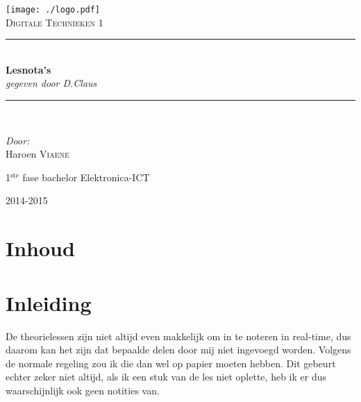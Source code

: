 \documentclass[11pt, a4paper]{article}
\newcommand{\HRule}{\rule{\linewidth}{0.5mm}}
\begin{document}
\begin{titlepage}
\begin{center}
\texttt{[image: ./logo.pdf]}~\\[1cm]


\textsc{\Large Digitale Technieken 1}\\[0.5cm]

\HRule \\[0.4cm]
{ \LARGE \bfseries Lesnota's}\\[0.4cm]
{\large \textit{gegeven door D.Claus}}\\[0.2cm]

\HRule \\[1.5cm]

\begin{minipage}{0.4\textwidth}
\begin{flushleft} \large
\emph{Door: }\\
Haroen \textsc{Viaene}\\

\end{flushleft}
\end{minipage}
\begin{minipage}{0.4\textwidth}
\begin{flushright} \large
\large{1$^{\text{ste}}$ fase bachelor Elektronica-ICT}\\
\end{flushright}
\end{minipage}

\vfill

{\large 2014-2015}

\end{center}
\end{titlepage}

\newpage

\section*{Inhoud}

\tableofcontents

\newpage

\section{Inleiding}

De theorielessen zijn niet altijd even makkelijk om in te noteren in real-time, dus daarom kan het zijn dat bepaalde delen door mij niet ingevoegd worden. Volgens de normale regeling zou ik die dan wel op papier moeten hebben. Dit gebeurt echter zeker niet altijd, als ik een stuk van de les niet oplette, heb ik er dus waarschijnlijk ook geen notities van.
\end{document}
